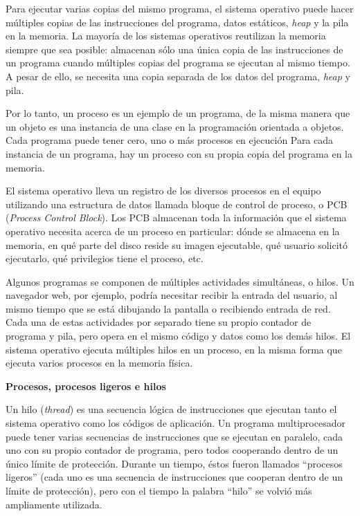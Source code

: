 \documentclass[10pt]{book}
\begin{document}
Para ejecutar varias copias del mismo programa, el sistema operativo puede hacer múltiples copias de las instrucciones del programa, datos estáticos, \textit{heap} y la pila en la memoria. La mayoría de los sistemas operativos reutilizan la memoria siempre que sea posible: almacenan sólo una única copia de las instrucciones de un programa cuando múltiples copias del programa se ejecutan al mismo tiempo. A pesar de ello, se necesita una copia separada de los datos del programa, \textit{heap} y pila.

Por lo tanto, un proceso es un ejemplo de un programa, de la misma manera que un objeto es una instancia de una clase en la programación orientada a objetos. Cada programa puede tener cero, uno o más procesos en ejecución Para cada instancia de un programa, hay un proceso con su propia copia del programa en la memoria.

El sistema operativo lleva un registro de los diversos procesos en el equipo utilizando una estructura de datos llamada bloque de control de proceso, o PCB (\textit{Process Control Block}). Los PCB almacenan toda la información que el sistema operativo necesita acerca de un proceso en particular: dónde se almacena en la memoria, en qué parte del disco reside su imagen ejecutable, qué usuario solicitó ejecutarlo, qué privilegios tiene el proceso, etc.

Algunos programas se componen de múltiples actividades simultáneas, o hilos. Un navegador web, por ejemplo, podría necesitar recibir la entrada del usuario, al mismo tiempo que se está dibujando la pantalla o recibiendo entrada de red. Cada una de estas actividades por separado tiene su propio contador de programa y pila, pero opera en el mismo código y datos como los demás hilos. El sistema operativo ejecuta múltiples hilos en un proceso, en la misma forma que ejecuta varios procesos en la memoria física.

\textbf{Procesos, procesos ligeros e hilos}

Un hilo (\textit{thread}) es una secuencia lógica de instrucciones que ejecutan tanto el sistema operativo como los códigos de aplicación. Un programa multiprocesador puede tener varias secuencias de instrucciones que se ejecutan en paralelo, cada uno con su propio contador de programa, pero todos cooperando dentro de un único límite de protección. Durante un tiempo, éstos fueron llamados ``procesos ligeros'' (cada uno es una secuencia de instrucciones que cooperan dentro de un límite de protección), pero con el tiempo la palabra ``hilo'' se volvió más ampliamente utilizada.
\end{document}
